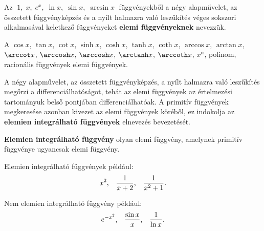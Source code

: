\begin{blueBox}
  Az $\; 1,\; x,\; e^x,\; \ln x,\; \sin x,\; \arcsin x \;$ függvényekből a négy
  alapművelet, az összetett függvényképzés és a nyílt halmazra való leszűkítés
  véges sokszori alkalmasával keletkező függvényeket \textbf{elemi
    függvényeknek} nevezzük.

  A $\cos x$, $\tan x$, $\cot x$, $\sinh x$, $\cosh x$, $\tanh x$, $\coth x$,
  $\arccos x$, $\arctan x$, $\arccot x$, $\arccosh x$, $\arccosh x$, $\arctanh
    x$, $\arccoth x$, $x^\alpha$, polinom, racionális függvények elemi
  függvények.

  A négy alapművelet, az összetett függvényképzés, a nyílt halmazra való
  leszűkítés megőrzi a differenciálhatóságot, tehát az elemi függvények az
  értelmezési tartományuk belső pontjában differenciálhatóak. A primitív
  függvények megkeresése azonban kivezet az elemi függvények köréből, ez
  indokolja az \textbf{elemien integrálható függvények} elnevezés bevezetését.

  \textbf{Elemien integrálható függvény} olyan elemi függvény, amelynek primitív
  függvénye ugyancsak elemi függvény.

  Elemien integrálható függvények például:
  \[
    x^2 \text, \quad
    \frac{1}{x + 2} \text, \quad
    \frac{1}{x^2 + 1} \text.
  \]

  Nem elemien integrálható függvény például:
  \[
    e^{-x^2} \text, \quad
    \frac{\sin x}{x} \text, \quad
    \frac{1}{\ln x} \text.
  \]
\end{blueBox}

\clearpage